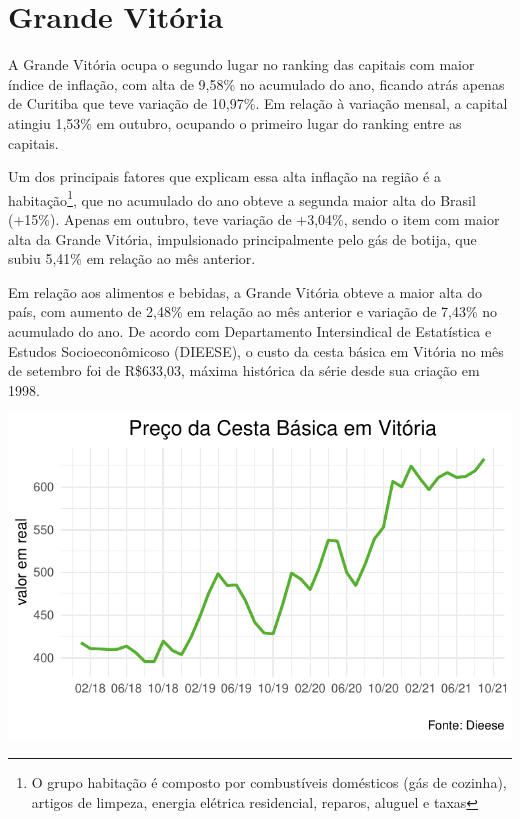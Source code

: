 \documentclass[100,a4paperpaper,]{article}
\begin{document}
\section{Grande Vitória} 
\vspace{0,25cm}

A Grande Vitória ocupa o segundo lugar no ranking das capitais com maior
índice de inflação, com alta de 9,58\% no acumulado do ano, ficando
atrás apenas de Curitiba que teve variação de 10,97\%. Em relação à
variação mensal, a capital atingiu 1,53\% em outubro, ocupando o
primeiro lugar do ranking entre as capitais.

Um dos principais fatores que explicam essa alta inflação na região é a
habitação\footnote{O grupo habitação é composto por combustíveis domésticos
 (gás de cozinha), artigos de limpeza, energia elétrica residencial, reparos, aluguel e taxas},
que no acumulado do ano obteve a segunda maior alta do Brasil (+15\%).
Apenas em outubro, teve variação de +3,04\%, sendo o item com maior alta
da Grande Vitória, impulsionado principalmente pelo gás de botija, que
subiu 5,41\% em relação ao mês anterior.

Em relação aos alimentos e bebidas, a Grande Vitória obteve a maior alta
do país, com aumento de 2,48\% em relação ao mês anterior e variação de
7,43\% no acumulado do ano. De acordo com Departamento Intersindical de
Estatística e Estudos Socioeconômicoso (DIEESE), o custo da cesta básica
em Vitória no mês de setembro foi de R\$633,03, máxima histórica da
série desde sua criação em 1998.

\begin{center}\includegraphics{inflacao_files/figure-latex/IPCA es-1} \end{center}
\end{document}
